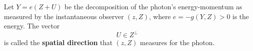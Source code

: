 Let $Y = e(Z + U)$ be the decomposition of the photon's energy-momentum as measured by the instantaneous observer $(z, Z)$, where $e = -g(Y, Z) > 0$ is the energy. The vector
$$
U \in Z^\perp
$$
is called the \textbf{spatial direction} that $(z, Z)$ measures for the photon.
